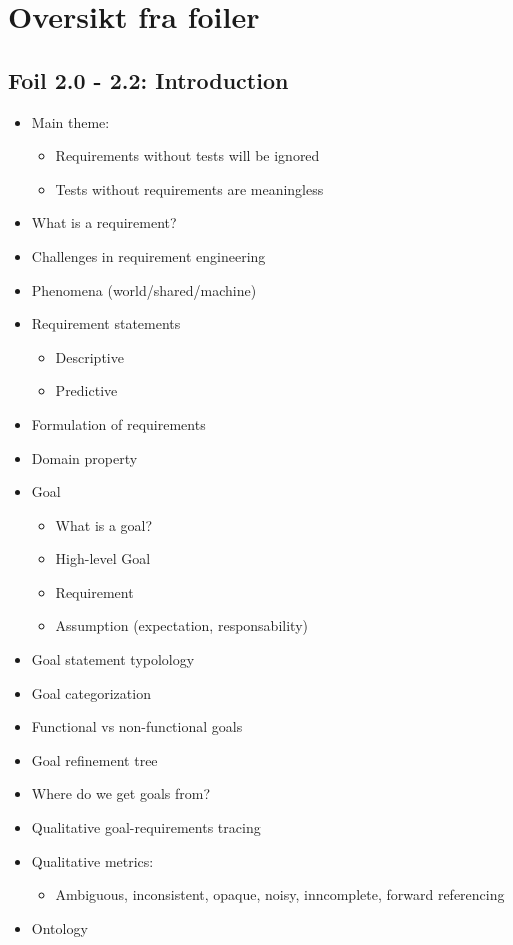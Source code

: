 \chapter{Oversikt fra foiler}
	
	\section{Foil 2.0 - 2.2: Introduction}
		\begin{itemize}
			\item Main theme:
				\begin{itemize}
					\item Requirements without tests will be ignored
					\item Tests without requirements are meaningless
				\end{itemize}
			\item What is a requirement?
			\item Challenges in requirement engineering
			\item Phenomena (world/shared/machine)
			\item Requirement statements
				\begin{itemize}
					\item Descriptive
					\item Predictive
				\end{itemize}
			\item Formulation of requirements
			\item Domain property
			\item Goal
				\begin{itemize}
					\item What is a goal?
					\item High-level Goal
					\item Requirement
					\item Assumption (expectation, responsability)
				\end{itemize}
			\item Goal statement typolology
			\item Goal categorization
			\item Functional vs non-functional goals
			\item Goal refinement tree
			\item Where do we get goals from?
			\item Qualitative goal-requirements tracing
			\item Qualitative metrics:
				\begin{itemize}
					\item Ambiguous, inconsistent, opaque, noisy, inncomplete, forward referencing
				\end{itemize}
			\item Ontology
		\end{itemize}

